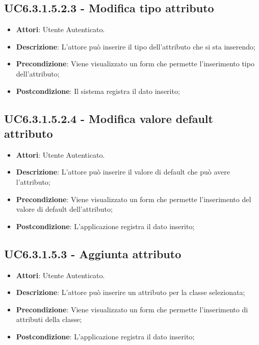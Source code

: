 \subsection{UC6.3.1.5.2.3 - Modifica tipo attributo} 
\label{ssec:UC6.3.1.5.2.3} 
\begin{itemize} 
\item \textbf{Attori}: Utente Autenticato.
\item \textbf{Descrizione}: L'attore può inserire il tipo dell'attributo che si sta inserendo;
\item \textbf{Precondizione}: Viene visualizzato un form che permette l'inserimento tipo dell'attributo;
\item \textbf{Postcondizione}: Il sistema registra il dato inserito;
\end{itemize} 
\subsection{UC6.3.1.5.2.4 - Modifica valore default attributo} 
\label{ssec:UC6.3.1.5.2.4} 
\begin{itemize} 
\item \textbf{Attori}: Utente Autenticato.
\item \textbf{Descrizione}: L'attore può inserire il valore di default che può avere l'attributo;
\item \textbf{Precondizione}: Viene visualizzato un form che permette l'inserimento del valore di default dell'attributo;
\item \textbf{Postcondizione}: L'applicazione registra il dato inserito;
\end{itemize} 
\subsection{UC6.3.1.5.3 - Aggiunta attributo} 
\label{ssec:UC6.3.1.5.3} 
\begin{itemize} 
\item \textbf{Attori}: Utente Autenticato.
\item \textbf{Descrizione}: L'attore può inserire un attributo per la classe selezionata;
\item \textbf{Precondizione}: Viene visualizzato un form che permette l'inserimento di attributi della classe;
\item \textbf{Postcondizione}: L'applicazione registra il dato inserito;
\end{itemize} 
